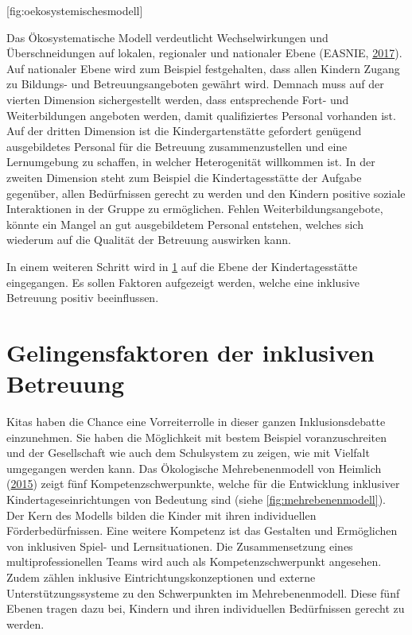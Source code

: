 \documentclass[
  ngerman,
  11pt,
  paper=a4,
  twoside,
  titlepage=true,
  openright,
  abstract=on,
  toc=listofnumbered,
  numbers=noenddot,
  chapterprefix=true,
  headings=optiontohead,
  svgnames,
  dvipsnames]{scrreprt}
\begin{document}
[fig:oekosystemischesmodell]

Das Ökosystematische Modell verdeutlicht Wechselwirkungen und
Überschneidungen auf lokalen, regionaler und nationaler Ebene (EASNIE,
\protect\hyperlink{ref-europaischeagentur}{2017}). Auf nationaler Ebene
wird zum Beispiel festgehalten, dass allen Kindern Zugang zu Bildungs-
und Betreuungsangeboten gewährt wird. Demnach muss auf der vierten
Dimension sichergestellt werden, dass entsprechende Fort- und
Weiterbildungen angeboten werden, damit qualifiziertes Personal
vorhanden ist. Auf der dritten Dimension ist die Kindergartenstätte
gefordert genügend ausgebildetes Personal für die Betreuung
zusammenzustellen und eine Lernumgebung zu schaffen, in welcher
Heterogenität willkommen ist. In der zweiten Dimension steht zum
Beispiel die Kindertagesstätte der Aufgabe gegenüber, allen Bedürfnissen
gerecht zu werden und den Kindern positive soziale Interaktionen in der
Gruppe zu ermöglichen. Fehlen Weiterbildungsangebote, könnte ein Mangel
an gut ausgebildetem Personal entstehen, welches sich wiederum auf die
Qualität der Betreuung auswirken kann.

In einem weiteren Schritt wird in \cref{sec:gelingensfaktoren} auf die
Ebene der Kindertagesstätte eingegangen. Es sollen Faktoren aufgezeigt
werden, welche eine inklusive Betreuung positiv beeinflussen.

\hypertarget{sec:gelingensfaktoren}{%
\section{Gelingensfaktoren der inklusiven
Betreuung}\label{sec:gelingensfaktoren}}

Kitas haben die Chance eine Vorreiterrolle in dieser ganzen
Inklusionsdebatte einzunehmen. Sie haben die Möglichkeit mit bestem
Beispiel voranzuschreiten und der Gesellschaft wie auch dem Schulsystem
zu zeigen, wie mit Vielfalt umgegangen werden kann. Das Ökologische
Mehrebenenmodell von Heimlich
(\protect\hyperlink{ref-inklusionQualituxe4t_Heimlich}{2015}) zeigt fünf
Kompetenzschwerpunkte, welche für die Entwicklung inklusiver
Kindertageseinrichtungen von Bedeutung sind (siehe
\cref{fig:mehrebenenmodell}). Der Kern des Modells bilden die Kinder mit
ihren individuellen Förderbedürfnissen. Eine weitere Kompetenz ist das
Gestalten und Ermöglichen von inklusiven Spiel- und Lernsituationen. Die
Zusammensetzung eines multiprofessionellen Teams wird auch als
Kompetenzschwerpunkt angesehen. Zudem zählen inklusive
Eintrichtungskonzeptionen und externe Unterstützungssysteme zu den
Schwerpunkten im Mehrebenenmodell. Diese fünf Ebenen tragen dazu bei,
Kindern und ihren individuellen Bedürfnissen gerecht zu werden.
\end{document}
